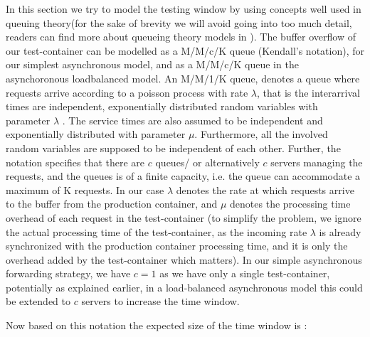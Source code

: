 In this section we try to model the testing window by using concepts well used in queuing theory(for the sake of brevity we will avoid going into too much detail, readers can find more about queueing theory models in \cite{queueWiki}).
The buffer overflow of our test-container can be modelled as a M/M/c/K queue (Kendall's notation\cite{kendall}), for our simplest asynchronous model, and as a M/M/c/K queue in the asynchoronous loadbalanced model.
An M/M/1/K queue, denotes a queue where requests arrive according to a poisson process with rate $\lambda$, that is the interarrival times are independent, exponentially distributed random variables with parameter $\lambda$ . 
The service times are also assumed to be independent and exponentially distributed with parameter $\mu$. Furthermore, all the involved random variables are supposed to be independent of each other. 
Further, the notation specifies that there are $c$ queues/ or alternatively $c$ servers managing the requests, and the queues is of a finite capacity, i.e. the queue can accommodate a maximum of K requests.
In our case $\lambda$ denotes the rate at which requests arrive to the buffer from the production container, and $\mu$ denotes the processing time overhead of each request in the test-container (to simplify the problem, we ignore the actual processing time of the test-container, as the incoming rate $\lambda$ is already synchronized with the production container processing time, and it is only the overhead added by the test-container which matters). 
In our simple asynchronous forwarding strategy, we have $c=1$ as we have only a single test-container, potentially as explained earlier, in a load-balanced asynchronous model this could be extended to $c$ servers to increase the time window.

Now based on this notation the expected size of the time window is :




